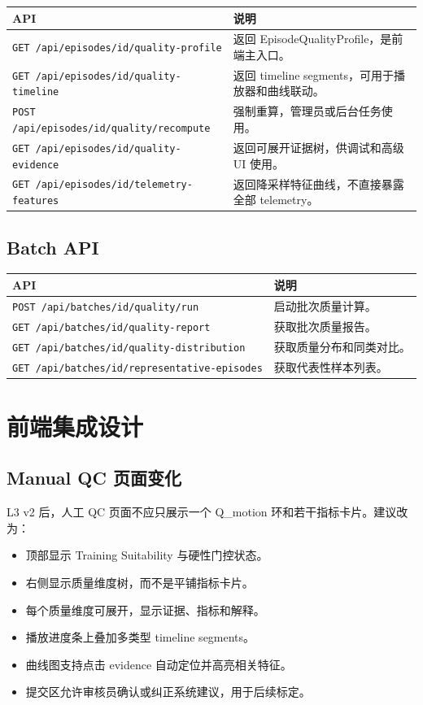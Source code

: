 \documentclass[UTF8,zihao=-4]{ctexart}
\newcommand{\Code}[1]{\texttt{#1}}
\begin{document}
\begin{longtable}{L{5cm} L{8.5cm}}
\toprule
API & 说明 \\
\midrule
\Code{GET /api/episodes/{id}/quality-profile} & 返回 EpisodeQualityProfile，是前端主入口。 \\
\Code{GET /api/episodes/{id}/quality-timeline} & 返回 timeline segments，可用于播放器和曲线联动。 \\
\Code{POST /api/episodes/{id}/quality/recompute} & 强制重算，管理员或后台任务使用。 \\
\Code{GET /api/episodes/{id}/quality-evidence} & 返回可展开证据树，供调试和高级 UI 使用。 \\
\Code{GET /api/episodes/{id}/telemetry-features} & 返回降采样特征曲线，不直接暴露全部 telemetry。 \\
\bottomrule
\end{longtable}

\subsection{Batch API}

\begin{longtable}{L{5cm} L{8.5cm}}
\toprule
API & 说明 \\
\midrule
\Code{POST /api/batches/{id}/quality/run} & 启动批次质量计算。 \\
\Code{GET /api/batches/{id}/quality-report} & 获取批次质量报告。 \\
\Code{GET /api/batches/{id}/quality-distribution} & 获取质量分布和同类对比。 \\
\Code{GET /api/batches/{id}/representative-episodes} & 获取代表性样本列表。 \\
\bottomrule
\end{longtable}

\section{前端集成设计}

\subsection{Manual QC 页面变化}

L3 v2 后，人工 QC 页面不应只展示一个 Q\_motion 环和若干指标卡片。建议改为：

\begin{itemize}
\item 顶部显示 Training Suitability 与硬性门控状态。
\item 右侧显示质量维度树，而不是平铺指标卡片。
\item 每个质量维度可展开，显示证据、指标和解释。
\item 播放进度条上叠加多类型 timeline segments。
\item 曲线图支持点击 evidence 自动定位并高亮相关特征。
\item 提交区允许审核员确认或纠正系统建议，用于后续标定。
\end{itemize}
\end{document}
